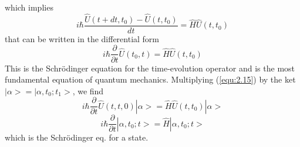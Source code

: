 which implies
$$
i\hbar \frac{\hat{U}(t+dt,t_0)-\hat{U}(t,t_0)}{dt} =
\hat{H}\hat{U}(t,t_0)
$$
that can be written in the differential form
\begin{equation}
  i\hbar \frac{\partial}{\partial t}\hat{U}(t_0,t) = \hat{H}
  \hat{U}(t,t_0)
  \label{equ:2.15}
\end{equation}
This is the Schrödinger equation for the time-evolution
operator and is the most fundamental equation of quantum
mechanics.
Multiplying (\ref{equ:2.15}) by the ket $|\alpha> =
|\alpha,t_0;t_1>$, we find
$$
i\hbar \frac{\partial}{\partial t} \hat{U}(t,t,0) |\alpha> =
\hat{H}\hat{U}(t,t_0) |\alpha>
$$
\begin{equation}
  i\hbar \frac{\partial}{\partial t} |\alpha,t_0;t> =
  \hat{H}|\alpha,t_0;t>
  \label{equ:2.16}
\end{equation}
which is the Schrödinger eq. for a state.

